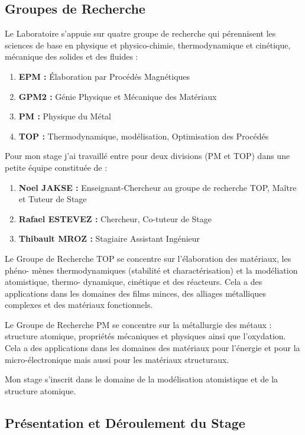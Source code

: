     \subsection{Groupes de Recherche}

        Le Laboratoire s'appuie sur quatre groupe de recherche qui pérennisent les sciences de base en physique et physico-chimie, thermodynamique et cinétique, mécanique des solides et des fluides : 

        \begin{enumerate}[\hspace{3em}$\bullet$]
            \item \textbf{EPM : }Élaboration par Procédés Magnétiques
            \item \textbf{GPM2 : }Génie Physique et Mécanique des Matériaux
            \item \textbf{PM : }Physique du Métal
            \item \textbf{TOP : }Thermodynamique, modélisation, Optimisation des Procédés
        \end{enumerate}
    
        Pour mon stage j'ai travaillé entre pour deux divisions (PM et TOP) dans une petite équipe constituée de : 

        \begin{enumerate}[\hspace{3em}$\bullet$]
            \item \textbf{Noel JAKSE : }Enseignant-Chercheur au groupe de recherche TOP, Maître et Tuteur de Stage
            \item \textbf{Rafael ESTEVEZ : }Chercheur, Co-tuteur de Stage
            \item \textbf{Thibault MROZ : }Stagiaire Assistant Ingénieur
        \end{enumerate}

        Le Groupe de Recherche TOP se concentre sur l'élaboration des matériaux, les phéno-
        mènes thermodynamiques (stabilité et charactérisation) et la modéliation atomistique, thermo-
        dynamique, cinétique et des réacteurs. Cela a des applications dans les domaines des films minces, des alliages métalliques complexes et des matériaux fonctionnels.

        Le Groupe de Recherche PM se concentre sur la métallurgie des métaux : structure atomique, propriétés mécaniques et physiques ainsi que l'oxydation. Cela a des applications dans les domaines des matériaux pour l'énergie et pour la micro-électronique mais aussi pour les matériaux structuraux. 

        Mon stage s'inscrit dans le domaine de la modélisation atomistique et de la structure atomique. 

    \subsection{Présentation et Déroulement du Stage}